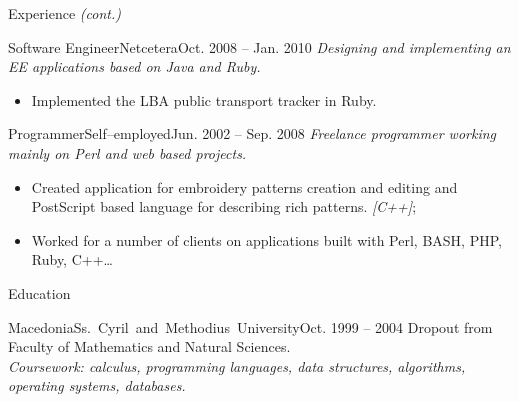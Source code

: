 \documentclass[]{mcdowellcv}
\begin{document}
    \begin{cvsection}{Experience \em{(cont.)}}
        \begin{cvsubsection}{Software Engineer}{Netcetera}{Oct. 2008 -- Jan. 2010}
            \textit{Designing and implementing an EE applications based on Java and Ruby.}
            \begin{itemize}
                \item Implemented the LBA public transport tracker in Ruby.
            \end{itemize}
        \end{cvsubsection}
        \begin{cvsubsection}{Programmer}{Self--employed}{Jun. 2002 -- Sep. 2008}
            \textit{Freelance programmer working mainly on Perl and web based projects.}
            \begin{itemize}
                \item Created application for embroidery patterns creation and editing and PostScript based language for describing rich patterns.
                    \textit{[C++]};
                \item Worked for a number of clients on applications built with Perl, BASH, PHP, Ruby, C++\ldots
            \end{itemize}
        \end{cvsubsection}
    \end{cvsection}
    \vspace*{20pt}

    \begin{cvsection}{Education}
    \label{Education}
        \begin{cvsubsection}{Macedonia}{\mbox{Ss. Cyril and Methodius University}}{Oct. 1999 -- 2004}
            Dropout from Faculty of Mathematics and Natural Sciences.
            \\ \textit{Coursework: calculus, programming languages, data structures, algorithms, operating systems, databases.}
        \end{cvsubsection}
    \end{cvsection}
    \vspace*{20pt}
\end{document}
